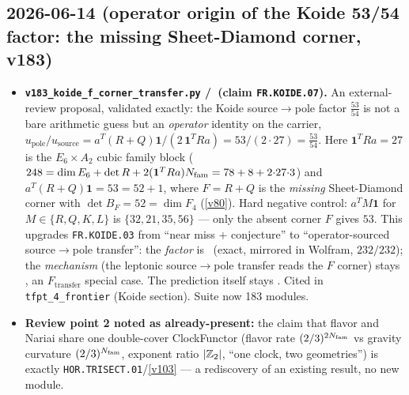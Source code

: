 \subsection*{2026-06-14 (operator origin of the Koide 53/54 factor: the missing Sheet-Diamond corner, v183)}
\begin{itemize}
\item \textbf{\texttt{v183\_koide\_f\_corner\_transfer.py} \mE/\mC\ (claim \texttt{FR.KOIDE.07}).} An
  external-review proposal, validated exactly: the Koide source$\to$pole factor $\tfrac{53}{54}$ is not
  a bare arithmetic guess but an \emph{operator} identity on the carrier,
  $u_{\mathrm{pole}}/u_{\mathrm{source}} = a^T(R+Q)\mathbf1 / (2\,\mathbf1^T R a) = 53/(2{\cdot}27) =
  \tfrac{53}{54}$. Here $\mathbf1^T R a = 27$ is the $E_6{\times}A_2$ cubic family block
  ($248 = \dim E_6 + \det R + 2(\mathbf1^T R a)N_{\mathrm{fam}} = 78+8+2{\cdot}27{\cdot}3$) and
  $a^T(R+Q)\mathbf1 = 53 = 52+1$, where $F = R+Q$ is the \emph{missing} Sheet-Diamond corner with
  $\det B_F = 52 = \dim F_4$ (\vref{v80}). Hard negative control: $a^T M\mathbf1$ for $M\in\{R,Q,K,L\}$
  is $\{32,21,35,56\}$ --- only the absent corner $F$ gives $53$. This upgrades \texttt{FR.KOIDE.03}
  from ``near miss $+$ conjecture'' to ``operator-sourced source$\to$pole transfer'': the \emph{factor}
  is \mE\ (exact, mirrored in Wolfram, $232/232$); the \emph{mechanism} (the leptonic source$\to$pole
  transfer reads the $F$ corner) stays \mC, an $F_{\mathrm{transfer}}$ special case. The prediction
  itself stays \mC. Cited in \texttt{tfpt\_4\_frontier} (Koide section). Suite now 183 modules.
\item \textbf{Review point 2 noted as already-present:} the claim that flavor and Nariai share one
  double-cover ClockFunctor (flavor rate $(2/3)^{2N_{\mathrm{fam}}}$ vs gravity curvature $(2/3)^{N_{\mathrm{fam}}}$, exponent
  ratio $|\mathbb{Z}_2|$, ``one clock, two geometries'') is exactly \texttt{HOR.TRISECT.01}/\vref{v103} --- a
  rediscovery of an existing result, no new module.
\end{itemize}

